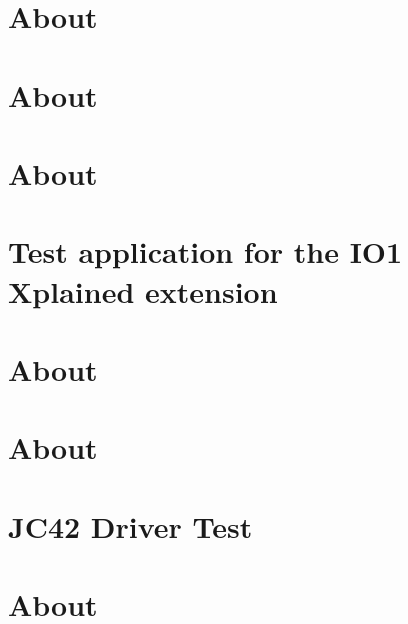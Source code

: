 \documentclass[twoside]{book}
\newcommand{\+}{\discretionary{\mbox{\scriptsize$\hookleftarrow$}}{}{}}
\begin{document}
\chapter{About}
\label{md__home_ayush_RIOT_tests_driver_hdc1000_README}

\chapter{About}
\label{md__home_ayush_RIOT_tests_driver_hih6130_README}

\chapter{About}
\label{md__home_ayush_RIOT_tests_driver_ina220_README}

\chapter{Test application for the I\+O1 Xplained extension}
\label{md__home_ayush_RIOT_tests_driver_io1_xplained_README}

\chapter{About}
\label{md__home_ayush_RIOT_tests_driver_isl29020_README}

\chapter{About}
\label{md__home_ayush_RIOT_tests_driver_isl29125_README}

\chapter{J\+C42 Driver Test}
\label{md__home_ayush_RIOT_tests_driver_jc42_README}

\chapter{About}
\label{md__home_ayush_RIOT_tests_driver_kw2xrf_README}

\end{document}
